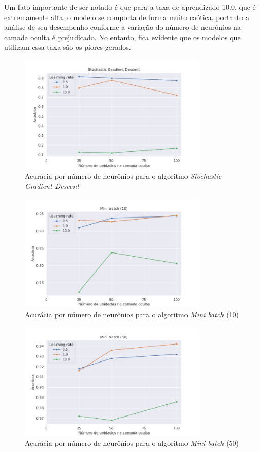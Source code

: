 \documentclass{article}
\begin{document}
Um fato importante de ser notado é que para a taxa de aprendizado 10.0, que é extremamente alta, o modelo se comporta de forma muito caótica, portanto a análise de seu desempenho conforme a variação do número de neurônios na
camada oculta é prejudicado. No entanto, fica evidente que os modelos que utilizam essa taxa são os piores gerados.

\begin{figure}[H]
    \centering
    \includegraphics[width=0.8\textwidth]{images/tradeoff/SGD.jpg}
    \caption{Acurácia por número de neurônios para o algoritmo \textit{Stochastic Gradient Descent}}
\end{figure}

\begin{figure}[H]
    \centering
    \includegraphics[width=0.8\textwidth]{images/tradeoff/MB10.jpg}
    \caption{Acurácia por número de neurônios para o algoritmo \textit{Mini batch} (10)}
\end{figure}

\begin{figure}[H]
    \centering
    \includegraphics[width=0.8\textwidth]{images/tradeoff/MB50.jpg}
    \caption{Acurácia por número de neurônios para o algoritmo \textit{Mini batch} (50)}
\end{figure}
\end{document}
